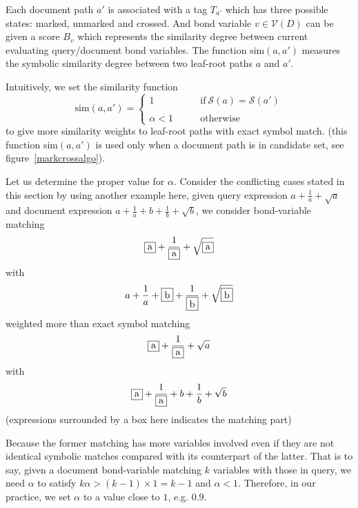 Each document path $a'$ is associated with a tag $T_{a'}$ which has three possible states: marked, unmarked and crossed. And bond variable $v \in \mathcal{V}(D)$ can be given a score $B_v$ which represents the similarity degree between current evaluating query/document bond variables. 
The function $\mathrm{sim}(a,a')$ measures the symbolic similarity degree between two leaf-root paths $a$ and $a'$. 

Intuitively, we set the similarity function
$$
\mathrm{sim}(a,a') = 
\left\{
\begin{array}{ll}
1    &\qquad \mathrm{if}\  \mathcal{S}(a) = \mathcal{S}(a')
\\
\\
\alpha < 1  &\qquad \mathrm{otherwise}
\end{array}
\right.
$$
to give more similarity weights to leaf-root paths with exact symbol match.
(this function $\mathrm{sim}(a,a')$ is used only when a document path is in candidate set, see figure~\ref{markcrossalgo}).

Let us determine the proper value for $\alpha$. 
Consider the conflicting cases stated in this section by using another example here, 
given query expression $a+\frac 1 a + \sqrt{a}$ and document expression $a+\frac 1 a + b + \frac 1 b + \sqrt{b}$, we consider bond-variable matching 
$$\fbox{a}+\dfrac 1 {\fbox{a}} + \sqrt{\fbox{a}}$$
with 
$$a+\dfrac 1 a + \fbox{b} + \dfrac 1 {\fbox{b}} + \sqrt{\fbox{b}}$$
weighted more than exact symbol matching 
$$\fbox{a}+\dfrac 1 {\fbox{a}} + \sqrt{a}$$ 
with 
$$\fbox{a}+\dfrac 1 {\fbox{a}} + b + \dfrac 1 b + \sqrt{b}$$
(expressions surrounded by a box here indicates the matching part)

Because the former matching has more variables involved even if they are not identical symbolic matches compared with its counterpart of the latter. 
That is to say, given a document bond-variable matching $k$ variables with those in query, we need $\alpha$ to satisfy $ k \alpha > (k-1) \times 1 = k - 1 $
and $\alpha < 1$. 
Therefore, in our practice, we set $\alpha$ to a value close to $1$, e.g. $0.9$.

